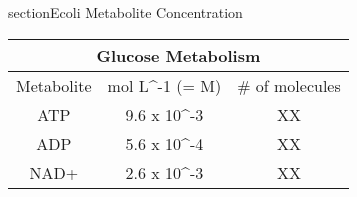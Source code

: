 \documentclass{article}
\begin{document}
    section{Ecoli Metabolite Concentration}
    \begin{tabular}{ ||c|c|c||} 
        \hline

        \multicolumn{3}{|c|}{Glucose Metabolism} \\
        \hline
        Metabolite & mol L^{-1} (= M) & # of molecules \\ 
        \hline
        ATP & 9.6 x 10^{-3} & XX \\ 
        ADP & 5.6 x 10^{-4} & XX \\ 
        NAD+ & 2.6 x 10^{-3} & XX \\ 
        \hline

    \end{tabular}
\end{document}
